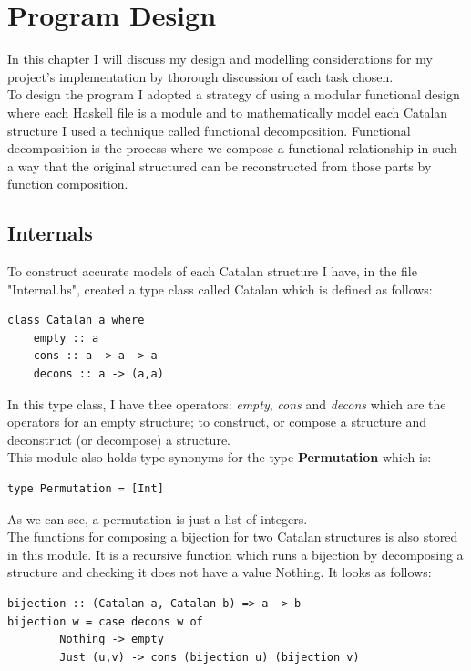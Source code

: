 \documentclass[12pt]{article}
\begin{document}
\section{Program Design}
In this chapter I will discuss my design and modelling considerations for my project's implementation by thorough discussion of each task chosen.\\
To design the program I adopted a strategy of using a modular functional design where each Haskell file is a module and to mathematically model each Catalan structure I used a technique called functional decomposition. Functional decomposition is the process where we compose a functional relationship in such a way that the original structured can be reconstructed from those parts by function composition.
\subsection{Internals}
To construct accurate models of each Catalan structure I have, in the file "Internal.hs", created a type class called Catalan which is defined as follows:
\begin{lstlisting}
class Catalan a where
	empty :: a
	cons :: a -> a -> a
	decons :: a -> (a,a)
\end{lstlisting}
In this type class, I have thee operators: {\it empty}, {\it cons} and {\it decons} which are the operators for an empty structure; to construct, or compose a structure and deconstruct (or decompose) a structure.\\
This module also holds type synonyms for the type {\bf Permutation} which is:
\begin{lstlisting}
type Permutation = [Int]
\end{lstlisting}
As we can see, a permutation is just a list of integers.\\
The functions for composing a bijection for two Catalan structures is also stored in this module. It is a recursive function which runs a bijection by decomposing a structure and checking it does not have a value Nothing. It looks as follows:
\begin{lstlisting}
bijection :: (Catalan a, Catalan b) => a -> b
bijection w = case decons w of
		Nothing -> empty
		Just (u,v) -> cons (bijection u) (bijection v)
\end{lstlisting}
\end{document}
